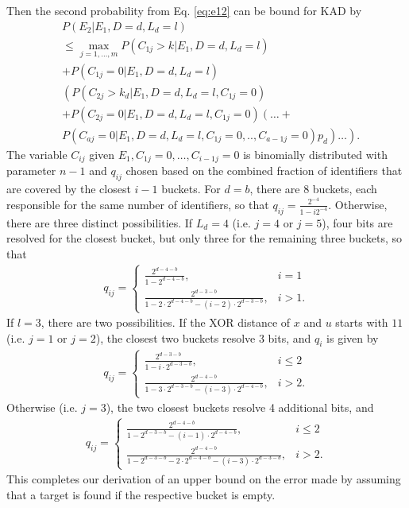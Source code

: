 \documentclass[10pt, conference, compsocconf, letterpaper]{IEEEtran}
\begin{document}
Then the second probability from Eq. \ref{eq:e12} can be bound for KAD by
\begin{align}
\label{eq:e2KAD}
& P(E_2|E_1,D=d,L_d=l) \nonumber \\
&\leq  \max_{j=1,\ldots , m} P(C_{1j} > k|E_1,D=d,L_d=l) \nonumber \\
&+P(C_{1j} = 0|E_1,D=d,L_d=l) \\
&\left(P(C_{2j} > k_d|E_1,D=d,L_d=l,C_{1j}=0) \right. \nonumber \\
&+ P(C_{2j} = 0|E_1,D=d,L_d=l,C_{1j}=0) \left(\ldots + \right. \nonumber\\
&\left. \left. P(C_{aj} = 0|E_1,D=d,L_d=l,C_{1j}=0,.., C_{a-1j}=0)p_d\right)\ldots \right). \nonumber
\end{align}
The variable $C_{ij}$ given $E_1,C_{1j}=0, \ldots ,C_{i-1j}=0$ is binomially distributed with parameter $n-1$ and $q_{ij}$ chosen based on the combined fraction of identifiers that are covered by the closest $i-1$ buckets.
For $d=b$, there are 8 buckets, each responsible for the same number of identifiers, so that 
$q_{ij}=\frac{2^{-4}}{1-i2^{-4}}$. 
Otherwise, there are three distinct possibilities. If $L_d=4$ (i.e. $j=4$ or $j=5$), four bits are resolved for the closest bucket, but only
three for the remaining three buckets, so that
\begin{align*}
q_{ij} = \begin{cases} 
\frac{2^{d-4-b}}{1-2^{d-4-b}}, & i=1 \\
\frac{2^{d-3-b}}{1-2\cdot 2^{d-4-b}-(i-2)\cdot 2^{d-3-b}}, & i>1.
\end{cases}
\end{align*} 
If $l=3$, there are two possibilities. If the XOR distance of $x$ and $u$ starts with $11$ (i.e. $j=1$ or $j=2$), the closest two buckets resolve 3 bits, and $q_i$ is given by
\begin{align*}
q_{ij} = \begin{cases} 
\frac{2^{d-3-b}}{1-i\cdot 2^{d-3-b}}, & i\leq 2 \\
\frac{2^{d-4-b}}{1-3\cdot 2^{d-3-b}-(i-3)\cdot 2^{d-4-b}}, & i>2.
\end{cases}
\end{align*} 
Otherwise (i.e. $j=3$), the two closest buckets resolve 4 additional bits, and
\begin{align*}
q_{ij} = \begin{cases} 
\frac{2^{d-4-b}}{1-2^{d-3-b}-(i-1)\cdot 2^{d-4-b}}, & i\leq 2 \\
\frac{2^{d-4-b}}{1-2^{d-3-b}-2\cdot 2^{d-4-b}-(i-3)\cdot 2^{d-3-b}}, & i>2.
\end{cases}
\end{align*} 
This completes our derivation of an upper bound on the error made by assuming that a target is found if the respective bucket is empty. 
\end{document}

